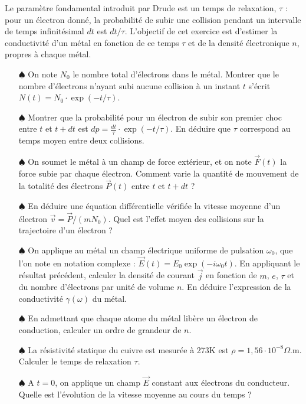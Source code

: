 \documentclass{report}
\begin{document}
\vspace{0,4cm}

Le paramètre fondamental introduit par Drude est un temps de relaxation, $\tau$ : pour un électron donné, la probabilité de subir une collision pendant un intervalle de temps infinitésimal $dt$ est $dt/\tau$. L'objectif de cet exercice est d'estimer la conductivité d'un métal en fonction de ce temps $\tau$ et de la densité électronique $n$, propres à chaque métal. 

\begin{itemize}
	
	\item[$\spadesuit$]	 On note $N_0$ le nombre total d'électrons dans le métal. Montrer que le nombre d'électrons n'ayant subi aucune collision à un instant $t$ s'écrit $N(t)=N_0\cdot\exp(-t/\tau)$.
	
	\item[$\spadesuit$]	 Montrer que la probabilité pour un électron de subir son premier choc entre $t$ et $t+dt$ est $dp=\frac{dt}{\tau}\cdot\exp(-t/\tau)$. En déduire que $\tau$ correspond au temps moyen entre deux collisions.
	
	\item[$\spadesuit$] On soumet le métal à un champ de force extérieur, et on note $\vec{F}(t)$ la force subie par chaque électron. Comment varie la quantité de mouvement de la totalité des électrons $\vec{P}(t)$ entre $t$ et $t+dt$ ?
	
	\item[$\spadesuit$] En déduire une équation différentielle vérifiée la vitesse moyenne d'un électron $\vec{v}=\vec{P}/(mN_0)$. Quel est l'effet moyen des collisions sur la trajectoire d'un électron ?
	
	\item[$\spadesuit$] On applique au métal un champ électrique uniforme de pulsation $\omega_0$, que l'on note en notation complexe : $\vec{E}(t)=E_0\exp(-i\omega_0t)$. En appliquant le résultat précédent, calculer la densité de courant $\vec{j}$ en fonction de $m$, $e$, $\tau$ et du nombre d'électrons par unité de volume $n$. En déduire l'expression de la conductivité $\gamma(\omega)$ du métal.
	
	\item[$\spadesuit$] En admettant que chaque atome du métal libère un électron de conduction, calculer un ordre de grandeur de $n$.
	
	\item[$\spadesuit$] La résistivité statique du cuivre est mesurée à 273K est $\rho=1,56\cdot10^{-8}\Omega$.m. Calculer le temps de relaxation $\tau$. 
	
	\item[$\spadesuit$] A $t=0$, on applique un champ $\vec{E}$ constant aux électrons du conducteur. Quelle est l'évolution de la vitesse moyenne au cours du temps ? 
\end{itemize}
\end{document}
